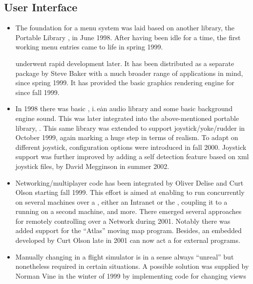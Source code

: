 \subsection{User Interface}
\begin{itemize}
\item The foundation for a menu system was laid based on another library,
 the Portable Library \PLIB{}, in June 1998. After having been idle for a time, the first working menu entries came to life in spring 1999.

  \PLIB{} underwent rapid development later. It has been distributed as a separate package by
  Steve Baker with a much broader range of applications in mind, since spring 1999. It  has provided the basic graphics rendering engine for \FlightGear{} since fall 1999.
\item In 1998 there was basic , i.\,e\. an audio library
and some basic background engine sound. This was later integrated into the
above-mentioned portable library, \PLIB{}. This same library was extended to
support joystick/yoke/rudder in October 1999, again marking a huge step
in terms of realism. To adapt on different joystick, configuration options were
introduced in fall 2000. Joystick support was further improved by adding a self detection feature based on xml joystick files, by David Megginson in summer 2002.
\item Networking/multiplayer
 code has been integrated by Oliver Delise  and Curt
Olson starting fall 1999. This effort is aimed at enabling
\FlightGear{}  to run concurrently on several machines over a , either an Intranet or the , coupling it to a  running on a second
machine, and more. There emerged several approaches for remotely controlling \FlightGear{} over a Network during 2001. Notably there was added support for the ``Atlas'' moving map program. Besides, an embedded  developed by Curt Olson late in 2001 can now act a  for external programs.
\item Manually changing  in a flight simulator is in a sense always ``unreal'' but
nonetheless required in certain situations. A possible solution was supplied by Norman
Vine in the winter of 1999 by implementing code for changing views

\end{itemize}
